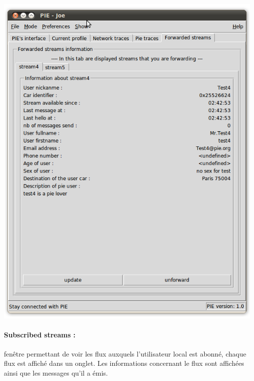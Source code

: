 \begin{center}
    \includegraphics[scale=0.5]{img/forwarded.png}
\end{center}

\clearpage


\paragraph{Subscribed streams :}
fenêtre permettant de voir les flux auxquels l'utilisateur local est abonné, chaque flux est affiché dans un onglet.
Les informations concernant le flux sont affichées ainsi que les messages qu'il a émis.

